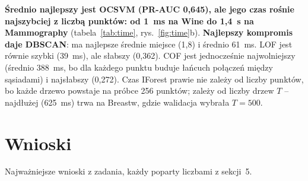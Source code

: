 \documentclass[11pt,a4paper]{article}
\begin{document}
\textbf{Średnio najlepszy jest OCSVM (PR-AUC 0,645), ale jego czas rośnie
najszybciej z liczbą punktów: od 1~ms na Wine do 1,4~s na Mammography}
(tabela~\ref{tab:time}, rys.~\ref{fig:time}b). \textbf{Najlepszy kompromis
daje DBSCAN}: ma najlepsze średnie miejsce (1,8) i średnio 61~ms. LOF jest
równie szybki (39~ms), ale słabszy (0,362). COF jest jednocześnie najwolniejszy
(średnio 388~ms, bo dla każdego punktu buduje łańcuch połączeń między
sąsiadami) i najsłabszy (0,272). Czas IForest prawie nie zależy od liczby
punktów, bo każde drzewo powstaje na próbce 256 punktów; zależy od liczby
drzew $T$ -- najdłużej (625~ms) trwa na Breastw, gdzie walidacja wybrała
$T=500$.

\FloatBarrier
\section{Wnioski}

Najważniejsze wnioski z zadania, każdy poparty liczbami z sekcji~5.
\end{document}
